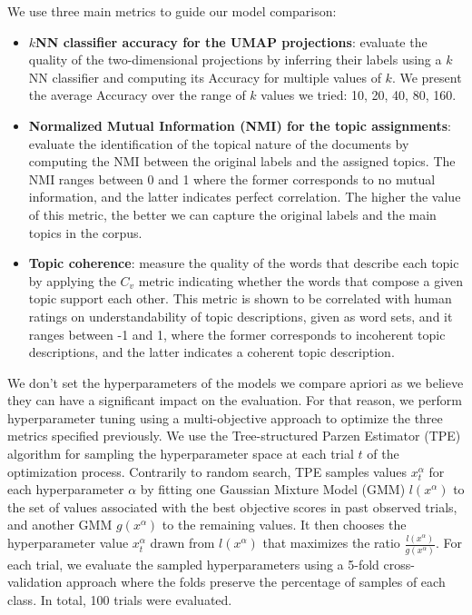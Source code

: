 \documentclass[a4paper]{article}
\begin{document}
We use three main metrics to guide our model comparison: 
\begin{itemize}
  \item \textbf{$k$NN classifier accuracy for the UMAP projections}: evaluate the quality of the two-dimensional projections by inferring their labels using a $k$NN classifier and computing its Accuracy for multiple values of $k$. We present the average Accuracy over the range of $k$ values we tried: 10, 20, 40, 80, 160.
  \item \textbf{Normalized Mutual Information (NMI) for the topic assignments}: evaluate the identification of the topical nature of the documents by computing the NMI between the original labels and the assigned topics. The NMI ranges between 0 and 1 where the former corresponds to no mutual information, and the latter indicates perfect correlation. The higher the value of this metric, the better we can capture the original labels and the main topics in the corpus.
  \item \textbf{Topic coherence}: measure the quality of the words that describe each topic by applying the $C_v$ metric \citep{roder2015} indicating whether the words that compose a given topic support each other. This metric is shown to be correlated with human ratings on understandability of topic descriptions, given as word sets, and it ranges between -1 and 1, where the former corresponds to incoherent topic descriptions, and the latter indicates a coherent topic description.
\end{itemize}

We don't set the hyperparameters of the models we compare apriori as we believe they can have a significant impact on the evaluation. For that reason, we perform hyperparameter tuning using a multi-objective approach to optimize the three metrics specified previously. We use the Tree-structured Parzen Estimator (TPE) algorithm \citep{bergstra2011, ozaki2020} for sampling the hyperparameter space at each trial $t$ of the optimization process. Contrarily to random search, TPE samples values $x_t^\alpha$ for each hyperparameter $\alpha$ by fitting one Gaussian Mixture Model (GMM) $l(x^\alpha)$ to the set of values associated with the best objective scores in past observed trials, and another GMM $g(x^\alpha)$ to the remaining values. It then chooses the hyperparameter value $x_t^\alpha$ drawn from $l(x^\alpha)$ that maximizes the ratio $\frac{l(x^\alpha)}{g(x^\alpha)}$. For each trial, we evaluate the sampled hyperparameters using a 5-fold cross-validation approach where the folds preserve the percentage of samples of each class. In total, 100 trials were evaluated.
\end{document}
